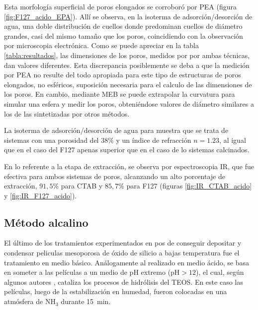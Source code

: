 		 Esta morfología superficial de poros elongados se corroboró por PEA (figura \ref{fig:F127_acido_EPA}). Allí se observa, en la isoterma de adsorción/desorción de agua, una doble distribución de cuellos donde predominan cuellos de diámetro grandes, casi del mismo tamaño que los poros, coincidiendo con la observación por microscopia electrónica.
		 Como se puede apreciar en la tabla \ref{tabla:resultados}, las dimensiones de los poros, medidos por por ambas técnicas, dan valores diferentes. Esta discrepancia posiblemente se deba a que la medición por PEA no resulte del todo apropiada para este tipo de estructuras de poros elongados, no esféricos, suposición necesaria para el calculo de las dimensiones de los poros. En cambio, mediante MEB se puede extrapolar la curvatura para simular una esfera y medir los poros, obteniéndose valores de diámetro similares a los de las \pdmF sintetizadas por otros métodos.

		 La isoterma de adsorción/desorción de agua para \pdmC\space muestra que se trata de sistemas con una porosidad del 38\% y un índice de refracción $n=1.23$, al igual que en el caso del F127 apenas superior que en el caso de lo sistemas calcinados.
		
		 En lo referente a la etapa de extracción, se observa por espectroscopia IR, que fue efectiva para ambos sistemas de poros, alcanzando un alto porcentaje de extracción, $91,5$\% para CTAB y $85,7$\% para F127 (figuras \ref{fig:IR_CTAB_acido} y \ref{fig:IR_F127_acido}).  	
				
	 \subsection{Método alcalino}

	 	 El último de los tratamientos experimentados en pos de conseguir depositar y condensar peliculas mesoporosa de óxido de silicio a bajas temperatura fue el tratamiento en medio básico. Análogamente al realizado en medio ácido, se basa en someter a las películas a un medio de pH extremo (pH$>12$), el cual, según algunos autores \cite{Soler-Illia2011,Huo1996,Ichinose2002,GonzalezSolveyra2017}, cataliza los procesos de hidrólisis del TEOS. En este caso las películas, luego de la estabilización en humedad, fueron colocadas en una atmósfera de NH$_3$ durante \SI{15}{\minute}. 

